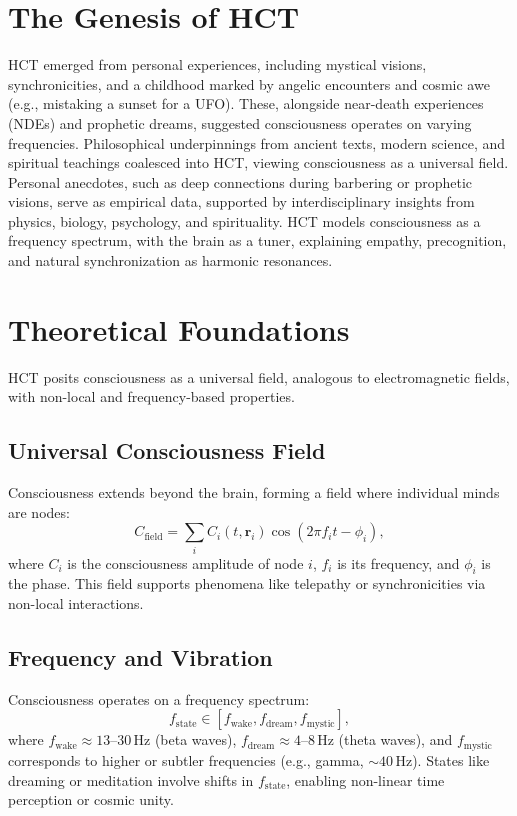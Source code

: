 \documentclass[a4paper,12pt]{article}
\begin{document}
\section{The Genesis of HCT}
\label{sec:genesis}
HCT emerged from personal experiences, including mystical visions, synchronicities, and a childhood marked by angelic encounters and cosmic awe (e.g., mistaking a sunset for a UFO). These, alongside near-death experiences (NDEs) and prophetic dreams, suggested consciousness operates on varying frequencies. Philosophical underpinnings from ancient texts, modern science, and spiritual teachings coalesced into HCT, viewing consciousness as a universal field. Personal anecdotes, such as deep connections during barbering or prophetic visions, serve as empirical data, supported by interdisciplinary insights from physics, biology, psychology, and spirituality. HCT models consciousness as a frequency spectrum, with the brain as a tuner, explaining empathy, precognition, and natural synchronization as harmonic resonances.

\section{Theoretical Foundations}
\label{sec:theory}
HCT posits consciousness as a universal field, analogous to electromagnetic fields, with non-local and frequency-based properties.

\subsection{Universal Consciousness Field}
Consciousness extends beyond the brain, forming a field where individual minds are nodes:
\begin{equation}
C_{\text{field}} = \sum_i C_i(t, \mathbf{r}_i) \cos(2\pi f_i t - \phi_i),
\label{eq:field}
\end{equation}
where $C_i$ is the consciousness amplitude of node $i$, $f_i$ is its frequency, and $\phi_i$ is the phase. This field supports phenomena like telepathy or synchronicities via non-local interactions.

\subsection{Frequency and Vibration}
Consciousness operates on a frequency spectrum:
\begin{equation}
f_{\text{state}} \in [f_{\text{wake}}, f_{\text{dream}}, f_{\text{mystic}}],
\label{eq:freq_spectrum}
\end{equation}
where $f_{\text{wake}} \approx 13\text{--}30 \, \text{Hz}$ (beta waves), $f_{\text{dream}} \approx 4\text{--}8 \, \text{Hz}$ (theta waves), and $f_{\text{mystic}}$ corresponds to higher or subtler frequencies (e.g., gamma, $\sim 40 \, \text{Hz}$). States like dreaming or meditation involve shifts in $f_{\text{state}}$, enabling non-linear time perception or cosmic unity.
\end{document}
